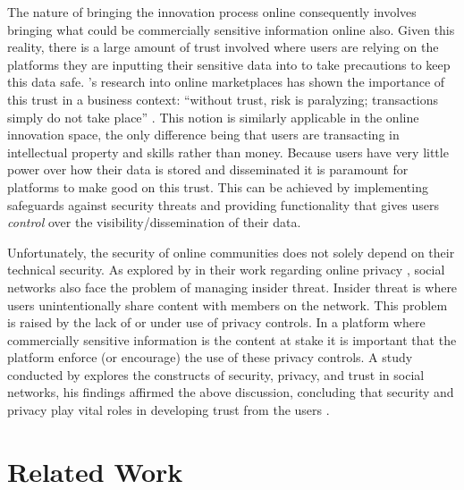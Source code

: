 The nature of bringing the innovation process online consequently involves bringing what could be commercially sensitive information online also. Given this reality, there is a large amount of trust involved where users are relying on the platforms they are inputting their sensitive data into to take precautions to keep this data safe. \citeauthor{boyd2002community}'s research into online marketplaces has shown the importance of this trust in a business context: ``without trust, risk is paralyzing; transactions simply do not take place'' \cite{boyd2002community}. This notion is similarly applicable in the online innovation space, the only difference being that users are transacting in intellectual property and skills rather than money. Because users have very little power over how their data is stored and disseminated it is paramount for platforms to make good on this trust. This can be achieved by implementing safeguards against security threats and providing functionality that gives users {\em control} over the visibility/dissemination of their data.

Unfortunately, the security of online communities does not solely depend on their technical security. As explored by \citeauthor{johnson2012facebook} in their work regarding online privacy \cite{johnson2012facebook}, social networks also face the problem of managing insider threat. Insider threat is where users unintentionally share content with members on the network. This problem is raised by the lack of or under use of privacy controls. In a platform where commercially sensitive information is the content at stake it is important that the platform enforce (or encourage) the use of these privacy controls. A study conducted by \citeauthor{shin2010effects} explores the constructs of security, privacy, and trust in social networks, his findings affirmed the above discussion, concluding that security and privacy play vital roles in developing trust from the users \cite{shin2010effects}.

\section{Related Work}

